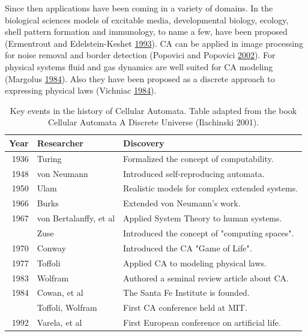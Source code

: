 \documentclass[
]{book}
\begin{document}
Since then applications have been coming in a variety of domains. In the biological sciences models of excitable media, developmental biology, ecology, shell pattern formation and immunology, to name a few, have been proposed (Ermentrout and Edelstein-Keshet \protect\hyperlink{ref-ermentrout1993cellular}{1993}). CA can be applied in image processing for noise removal and border detection (Popovici and Popovici \protect\hyperlink{ref-popovici2002cellular}{2002}). For physical systems fluid and gas dynamics are well suited for CA modeling (Margolus \protect\hyperlink{ref-margolus1984physics}{1984}). Also they have been proposed as a discrete approach to expressing physical laws (Vichniac \protect\hyperlink{ref-vichniac1984simulating}{1984}).

\begin{table}

\caption{\label{tab:key-events}Key events in the history of Cellular Automata. Table adapted from the book Cellular Automata A Discrete Universe (Ilachinski 2001).}
\centering
\begin{tabular}[t]{rll}
\toprule
Year & Researcher & Discovery\\
\midrule
1936 & Turing & Formalized the concept of computability.\\
1948 & von Neumann & Introduced self-reproducing automata.\\
1950 & Ulam & Realistic models for complex extended systems.\\
1966 & Burks & Extended von Neumann's work.\\
1967 & von Bertalanffy, et al & Applied System Theory to human systems.\\
\addlinespace
1969 & Zuse & Introduced the concept of "computing spaces".\\
1970 & Conway & Introduced the CA "Game of Life".\\
1977 & Toffoli & Applied CA to modeling physical laws.\\
1983 & Wolfram & Authored a seminal review article about CA.\\
1984 & Cowan, et al & The Santa Fe Institute is founded.\\
\addlinespace
1987 & Toffoli, Wolfram & First CA conference held at MIT.\\
1992 & Varela, et al & First European conference on artificial life.\\
\bottomrule
\end{tabular}
\end{table}
\end{document}
